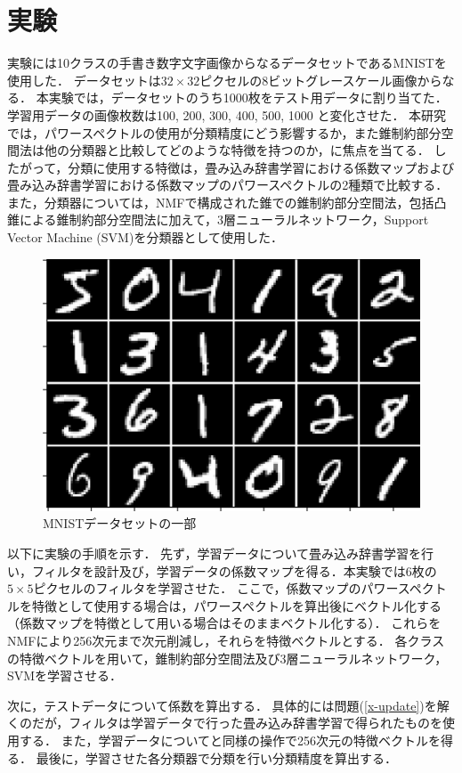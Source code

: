 \section{実験}
実験には10クラスの手書き数字文字画像からなるデータセットであるMNISTを使用した．
データセットは$32\times 32$ピクセルの8ビットグレースケール画像からなる．
本実験では，データセットのうち1000枚をテスト用データに割り当てた．
学習用データの画像枚数は100, 200, 300, 400, 500, 1000 と変化させた．
本研究では，パワースペクトルの使用が分類精度にどう影響するか，また錐制約部分空間法は他の分類器と比較してどのような特徴を持つのか，に焦点を当てる．
したがって，分類に使用する特徴は，畳み込み辞書学習における係数マップおよび畳み込み辞書学習における係数マップのパワースペクトルの2種類で比較する．
また，分類器については，NMFで構成された錐での錐制約部分空間法，包括凸錐による錐制約部分空間法に加えて，3層ニューラルネットワーク，Support Vector Machine (SVM)を分類器として使用した．


\begin{figure}[htb]
	\centering
	\includegraphics[width=0.7\linewidth]{image/mnist_sample.png}
	\caption{MNISTデータセットの一部}
	\label{fig:mnistsample}
\end{figure}

以下に実験の手順を示す．
先ず，学習データについて畳み込み辞書学習を行い，フィルタを設計及び，学習データの係数マップを得る．本実験では$6$枚の$5\times 5$ピクセルのフィルタを学習させた．
ここで，係数マップのパワースペクトルを特徴として使用する場合は，パワースペクトルを算出後にベクトル化する（係数マップを特徴として用いる場合はそのままベクトル化する）．
これらをNMFにより256次元まで次元削減し，それらを特徴ベクトルとする．
各クラスの特徴ベクトルを用いて，錐制約部分空間法及び3層ニューラルネットワーク，SVMを学習させる．

次に，テストデータについて係数を算出する．
具体的には問題(\ref{x-update})を解くのだが，フィルタは学習データで行った畳み込み辞書学習で得られたものを使用する．
また，学習データについてと同様の操作で256次元の特徴ベクトルを得る．
最後に，学習させた各分類器で分類を行い分類精度を算出する．


